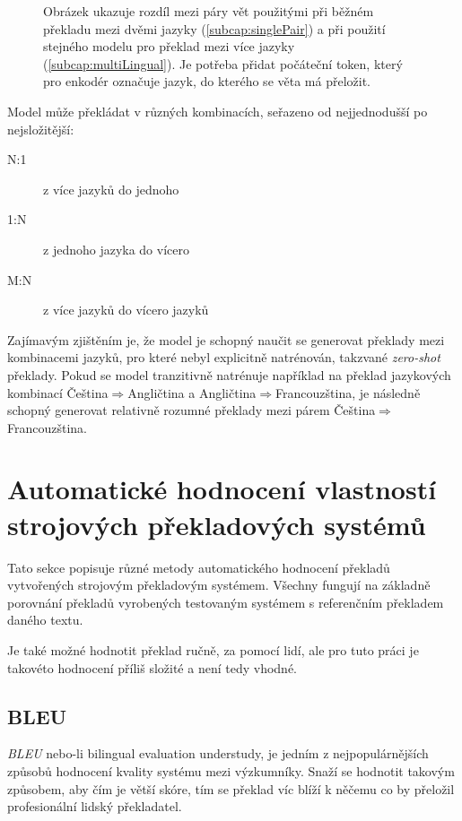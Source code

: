 \begin{figure}[H]
	\caption{Obrázek ukazuje rozdíl mezi páry vět použitými při běžném překladu mezi dvěmi jazyky (\ref{subcap:singlePair}) a při použití stejného modelu pro překlad mezi více jazyky (\ref{subcap:multiLingual}). Je potřeba přidat počáteční token, který pro enkodér označuje jazyk, do kterého se věta má přeložit.}
	\label{figure:multiLingDataset}
\end{figure}

Model může překládat v různých kombinacích, seřazeno od nejjednodušší po nejsložitější:
\begin{description}
  \item[N:1] z více jazyků do jednoho
  \item[1:N] z jednoho jazyka do vícero
  \item[M:N] z více jazyků do vícero jazyků
\end{description}

Zajímavým zjištěním je, že model je schopný naučit se generovat překlady mezi kombinacemi jazyků, pro které nebyl explicitně natrénován, takzvané \emph{zero-shot} překlady. Pokud se model tranzitivně natrénuje například na překlad jazykových kombinací Čeština$\Rightarrow$Angličtina a Angličtina$\Rightarrow$Francouzština, je následně schopný generovat relativně rozumné překlady mezi párem Čeština$\Rightarrow$Francouzština.


\section{Automatické hodnocení vlastností strojových překladových systémů}
Tato sekce popisuje různé metody automatického hodnocení překladů vytvořených strojovým překladovým systémem. Všechny fungují na základně porovnání překladů vyrobených testovaným systémem s referenčním překladem daného textu.

Je také možné hodnotit překlad ručně, za pomocí lidí, ale pro tuto práci je takovéto hodnocení příliš složité a není tedy vhodné.

\subsection{BLEU} \label{subsection:bleu}
\emph{BLEU} \cite{BLEU} nebo-li bilingual evaluation understudy, je jedním z nejpopulárnějších způsobů hodnocení kvality systému mezi výzkumníky. Snaží se hodnotit takovým způsobem, aby čím je větší skóre, tím se překlad víc blíží k něčemu co by přeložil profesionální lidský překladatel.

